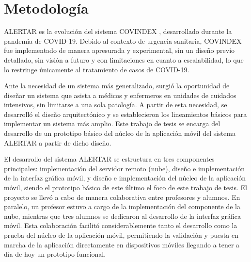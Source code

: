 


\section{Metodología}
ALERTAR es la evolución del sistema COVINDEX \cite{chiarotto2024covindex, chiarottoJornadasCloud}, desarrollado durante la pandemia de COVID-19. Debido al contexto de urgencia sanitaria, COVINDEX fue implementado de manera apresurada y experimental, sin un diseño previo detallado, sin visión a futuro y con limitaciones en cuanto a escalabilidad, lo que lo restringe únicamente al tratamiento de casos de COVID-19.

Ante la necesidad de un sistema más generalizado, surgió la oportunidad de diseñar un sistema que asista a médicos y enfermeros en unidades de cuidados intensivos, sin limitarse a una sola patología. A partir de esta necesidad, se desarrolló el diseño arquitectónico y se establecieron los lineamientos básicos para implementar un sistema más amplio. Este trabajo de tesis se encarga del desarrollo de un prototipo básico del núcleo de la aplicación móvil del sistema ALERTAR a partir de dicho diseño.

El desarrollo del sistema ALERTAR se estructura en tres componentes principales: implementación del servidor remoto (nube), diseño e implementación de la interfaz gráfica móvil, y diseño e implementación del núcleo de la aplicación móvil, siendo el prototipo básico de este último el foco de este trabajo de tesis. El proyecto se llevó a cabo de manera colaborativa entre profesores y alumnos. En paralelo, un profesor estuvo a cargo de la implementación del componente de la nube, mientras que tres alumnos se dedicaron al desarrollo de la interfaz gráfica móvil. Esta colaboración facilitó considerablemente tanto el desarrollo como la prueba del núcleo de la aplicación móvil, permitiendo la validación y puesta en marcha de la aplicación directamente en dispositivos móviles llegando a tener a día de hoy un prototipo funcional.

